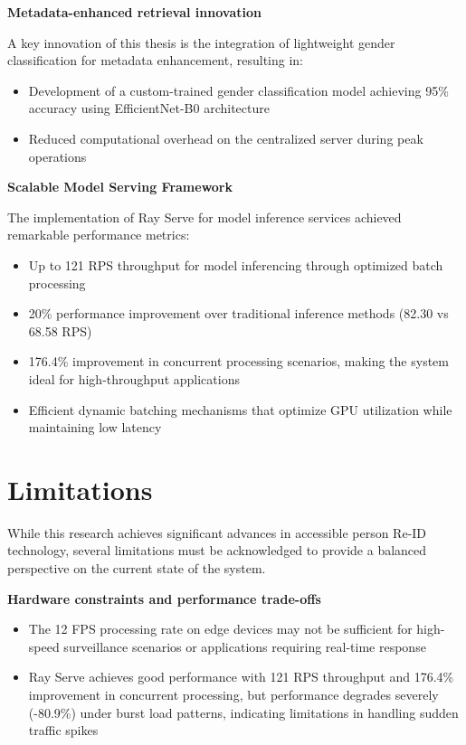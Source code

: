 \documentclass[../main.tex]{subfiles}
\begin{document}
\textbf{Metadata-enhanced retrieval innovation}

A key innovation of this thesis is the integration of lightweight gender classification for metadata enhancement, resulting in:

\begin{itemize}
    \item Development of a custom-trained gender classification model achieving 95\% accuracy using EfficientNet-B0 architecture
    \item Reduced computational overhead on the centralized server during peak operations
\end{itemize}

\textbf{Scalable Model Serving Framework}

The implementation of Ray Serve for model inference services achieved remarkable performance metrics:

\begin{itemize}
    \item Up to 121 RPS throughput for model inferencing through optimized batch processing
    \item 20\% performance improvement over traditional inference methods (82.30 vs 68.58 RPS)
    \item 176.4\% improvement in concurrent processing scenarios, making the system ideal for high-throughput applications
    \item Efficient dynamic batching mechanisms that optimize GPU utilization while maintaining low latency
\end{itemize}

\section{Limitations}

While this research achieves significant advances in accessible person Re-ID technology, several limitations must be acknowledged to provide a balanced perspective on the current state of the system.

\textbf{Hardware constraints and performance trade-offs}

\begin{itemize}
    \item The 12 FPS processing rate on edge devices may not be sufficient for high-speed surveillance scenarios or applications requiring real-time response
    \item Ray Serve achieves good performance with 121 RPS throughput and 176.4\% improvement in concurrent processing, but performance degrades severely (-80.9\%) under burst load patterns, indicating limitations in handling sudden traffic spikes
\end{itemize}
\end{document}
